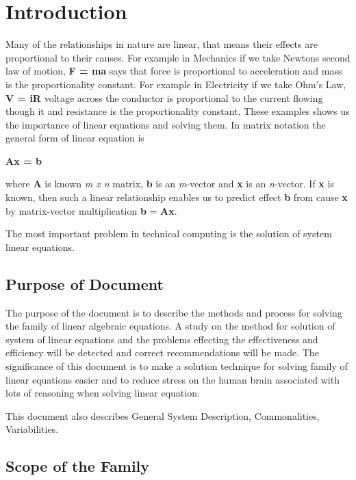 \documentclass[12pt]{article}
\begin{document}
\newpage
{}

\section{Introduction}

Many of the relationships in nature are linear, that means their effects are
proportional to their causes. For example in Mechanics if we take Newtons second
law of motion, \textbf{F = ma} says that force is proportional to acceleration
and mass is the proportionality constant. For example in Electricity if we take
Ohm's Law, \textbf{V = iR} voltage across the conductor is proportional to the
current flowing though it and resistance is the proportionality constant. These
examples shows us the importance of linear equations and solving them. In matrix
notation the general form of linear equation is

 \centerline{\textbf{Ax = b}}

where \textbf{A} is known \textit{m x n} matrix, \textbf{b} is an
\textit{m}-vector and \textbf{x} is an \textit{n}-vector. If \textbf{x} is
known, then such a linear relationship enables us to predict effect \textbf{b}
from cause \textbf{x} by matrix-vector multiplication \textbf{b} =
\textbf{A}\textbf{x}.

The most important problem in technical computing is the solution of system
linear equations.



\subsection{Purpose of Document}

The purpose of the document is to describe the methods and process for solving
the family of linear algebraic equations. A study on the method for solution of
system of linear equations and the problems effecting the effectiveness and
efficiency will be detected and correct recommendations will be made. The
significance of this document is to make a solution technique for solving family
of linear equations easier and to reduce stress on the human brain associated
with lots of reasoning when solving linear equation.

This document also describes General System Description, Commonalities,
Variabilities.

\subsection{Scope of the Family} 
\end{document}
